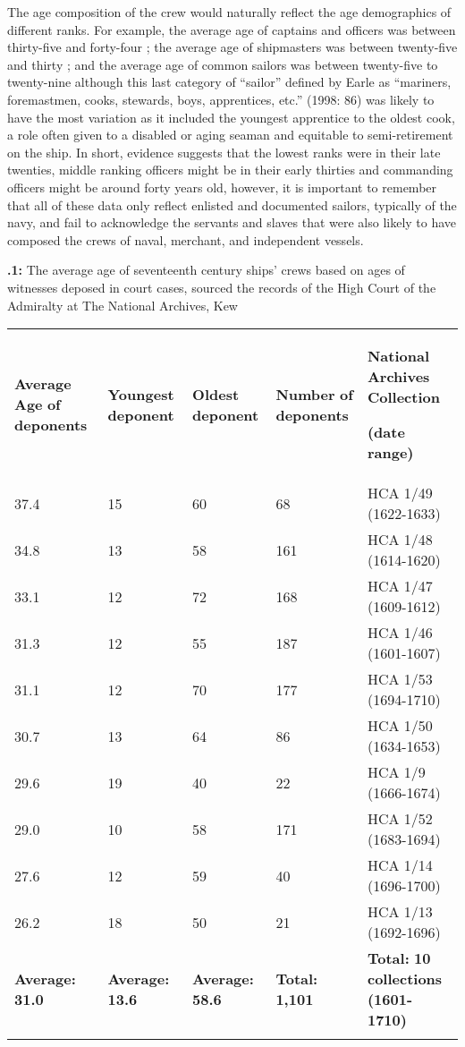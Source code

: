 The age composition of the crew would naturally reflect the age demographics of different ranks. For example, the average age of captains and officers was between thirty-five and forty-four \citep[86]{Earle1998}; the average age of shipmasters was between twenty-five and thirty \citep[38-39]{Walsh1994}; and the average age of common sailors was between twenty-five to twenty-nine \citep[86,]{Earle1998} although this last category of “sailor” defined by Earle as “mariners, foremastmen, cooks, stewards, boys, apprentices, etc.” (1998: 86) was likely to have the most variation as it included the youngest apprentice to the oldest cook, a role often given to a disabled or aging seaman and equitable to semi-retirement on the ship. In short, evidence suggests that the lowest ranks were in their late twenties, middle ranking officers might be in their early thirties and commanding officers might be around forty years old, however, it is important to remember that all of these data only reflect enlisted and documented sailors, typically of the navy, and fail to acknowledge the servants and slaves that were also likely to have composed the crews of naval, merchant, and independent vessels. 

\textbf{.1:} The average age of seventeenth century ships’ crews based on ages of witnesses deposed in court cases, sourced the records of the High Court of the Admiralty at The National Archives, Kew 

\begin{tabularx}{\textwidth}{XXXXX}
\lsptoprule

 \textbf{Average} \textbf{Age} \textbf{of} \textbf{deponents} &  \textbf{Youngest} \textbf{deponent} &  \textbf{Oldest} \textbf{deponent} &  \textbf{Number} \textbf{of} \textbf{deponents} &  \textbf{National} \textbf{Archives} \textbf{Collection} \par

 \textbf{(date} \textbf{range)}\\
 37.4 &  15 &  60 &  68 &  HCA 1/49 (1622-1633)\\
 34.8 &  13 &  58 &  161 &  HCA 1/48 (1614-1620)\\
 33.1 &  12 &  72 &  168 &  HCA 1/47 (1609-1612)\\
 31.3 &  12 &  55 &  187 &  HCA 1/46 (1601-1607)\\
 31.1 &  12 &  70 &  177 &  HCA 1/53 (1694-1710)\\
 30.7 &  13 &  64 &  86 &  HCA 1/50 (1634-1653)\\
 29.6 &  19 &  40 &  22 &  HCA 1/9 (1666-1674)\\
 29.0 &  10 &  58 &  171 &  HCA 1/52 (1683-1694)\\
 27.6 &  12 &  59 &  40 &  HCA 1/14 (1696-1700)\\
 26.2 &  18 &  50 &  21 &  HCA 1/13 (1692-1696)\\
 \textbf{Average:} \textbf{31.0} &  \textbf{Average:} \textbf{13.6} &  \textbf{Average:} \textbf{58.6} &  \textbf{Total:} \textbf{1,101} & \textbf{Total:} \textbf{10} \textbf{collections} \textbf{(1601-1710)}\\
\lspbottomrule
\end{tabularx}
